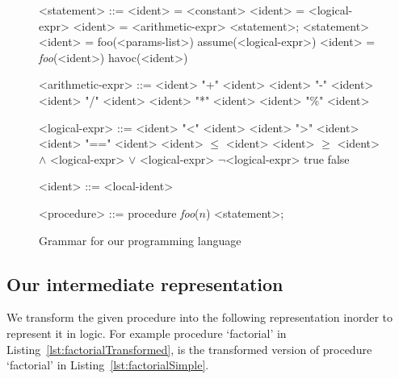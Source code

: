 \documentclass{llncs}
\newcommand{\foo}{\textit{foo}}
\newcommand{\n}{\textit{n}}
\begin{document}
\begin{figure}[hb!]
  \begin{grammar}
    <statement> ::= <ident> = <constant>
    \alt <ident> = <logical-expr>
    \alt <ident> = <arithmetic-expr>
    \alt <statement>; <statement>
    \alt <ident> = foo(<params-list>)
    \alt assume(<logical-expr>)
    \alt <ident> = \foo(<ident>)
    \alt havoc(<ident>)


    <arithmetic-expr> ::= <ident> "+" <ident>
    \alt <ident> "-" <ident>
    \alt <ident> "/" <ident>
    \alt <ident> "*" <ident>
    \alt <ident> "\%" <ident>
 
    <logical-expr> ::= <ident> "<" <ident>
    \alt <ident> ">" <ident>
    \alt <ident> "==" <ident>
    \alt <ident> $\leq$ <ident>
    \alt <ident> $\geq$ <ident>
     $\wedge$ <logical-expr>
     $\vee$ <logical-expr>
    \alt $\neg$<logical-expr>
    \alt true
    \alt false

    <ident> ::= <local-ident>
    
    <procedure> ::= procedure \foo ($\n$) {<statement>;}
  \end{grammar}
  \caption{Grammar for our programming language}
  \label{fig:grammar}
\end{figure}

\subsection{Our intermediate representation}\label{sec:intermediate}
We transform the given procedure into the following representation
inorder to represent it in logic.
For example procedure `factorial' in
Listing~\ref{lst:factorialTransformed}, is the transformed version of
procedure `factorial' in Listing~\ref{lst:factorialSimple}.
\end{document}
